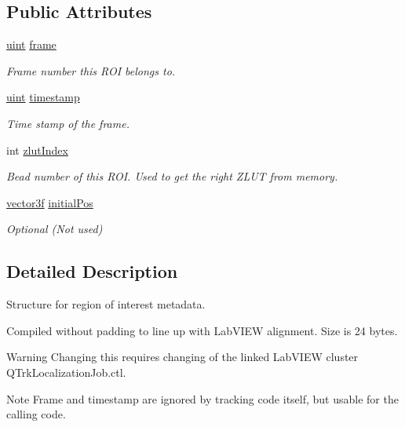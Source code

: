 \subsection*{Public Attributes}
\begin{DoxyCompactItemize}
\item 
\hyperlink{std__incl_8h_a91ad9478d81a7aaf2593e8d9c3d06a14}{uint} \hyperlink{struct_localization_job_a54df1ba33ab48b20dca664142a8cf619}{frame}
\begin{DoxyCompactList}\small\item\em Frame number this R\+OI belongs to. \end{DoxyCompactList}\item 
\hyperlink{std__incl_8h_a91ad9478d81a7aaf2593e8d9c3d06a14}{uint} \hyperlink{struct_localization_job_a82f4cdb35dd3b6765df52dd045007286}{timestamp}
\begin{DoxyCompactList}\small\item\em Time stamp of the frame. \end{DoxyCompactList}\item 
int \hyperlink{struct_localization_job_afcf9f91b72597af0e2572f3ae74d9a99}{zlut\+Index}
\begin{DoxyCompactList}\small\item\em Bead number of this R\+OI. Used to get the right Z\+L\+UT from memory. \end{DoxyCompactList}\item 
\hyperlink{std__incl_8h_a2feaef1d85a74bd5cf80df91b1a9a914}{vector3f} \hyperlink{struct_localization_job_a6374e6cba33c93846a757328b13aa509}{initial\+Pos}
\begin{DoxyCompactList}\small\item\em Optional (Not used) \end{DoxyCompactList}\end{DoxyCompactItemize}


\subsection{Detailed Description}
Structure for region of interest metadata. 

Compiled without padding to line up with Lab\+V\+I\+EW alignment. Size is 24 bytes. \begin{DoxyWarning}{Warning}
Changing this requires changing of the linked Lab\+V\+I\+EW cluster Q\+Trk\+Localization\+Job.\+ctl. 
\end{DoxyWarning}
\begin{DoxyNote}{Note}
Frame and timestamp are ignored by tracking code itself, but usable for the calling code. 
\end{DoxyNote}


